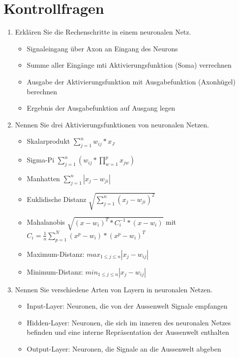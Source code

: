 \documentclass[a4paper,10pt,titlepage]{scrartcl}
\begin{document}
\section{Kontrollfragen}
\begin{enumerate}
    \item Erklären Sie die Rechenschritte in einem neuronalen Netz.
          \begin{itemize}
              \item Signaleingang über Axon an Eingang des Neurons
              \item Summe aller Eingänge mti Aktivierungsfunktion (Soma) verrechnen
              \item Ausgabe der Aktivierungsfunktion mit Ausgabefunktion (Axonhügel) berechnen
              \item Ergebnis der Ausgabefunktion auf Ausgang legen
          \end{itemize}
    \item Nennen Sie drei Aktivierungsfunktionen von neuronalen Netzen.
          \begin{itemize}
              \item Skalarprodukt $\sum_{j=1}^n w_{ij} * x_J$
              \item Sigma-Pi $\sum_{j=1}^n (w_{ij} * \prod_{w=1}^p x_{jw})$
              \item Manhatten $\sum_{j=1}^n |x_j-w_{ji}|$
              \item Euklidische Distanz $\sqrt{\sum_{j=1}^n (x_j-w_{ji})^2}$
              \item Mahalanobis $\sqrt{(x-w_i)^T *C_i^{-1} * (x-w_i)}$ mit $C_i=\frac{1}{n} \sum_{p=1}^N (x^p-w_i)*(x^p-w_i)^T$
              \item Maximum-Distanz: $max_{1\leq j\leq n} |x_j-w_{ij}|$
              \item Minimum-Distanz: $min_{1\leq j\leq n} |x_j-w_{ij}|$
          \end{itemize}
    \item Nennen Sie verschiedene Arten von Layern in neuronalen Netzen.
          \begin{itemize}
              \item Input-Layer: Neuronen, die von der Aussenwelt Signale empfangen
              \item Hidden-Layer: Neuronen, die sich im inneren des neuronalen Netzes befinden und eine interne Repräsentation der Aussenwelt enthalten
              \item Output-Layer: Neuronen, die Signale an die Aussenwelt abgeben

\end{itemize}
\end{enumerate}
\end{document}
